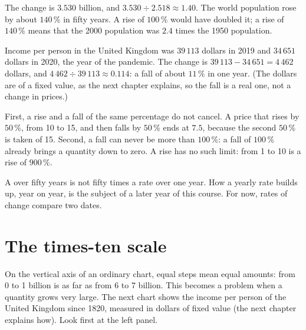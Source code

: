 \begin{example}\label{ex:g6:reading-economic-charts:pop-rise}
The change is $3.530$ billion, and $3.530 \div 2.518 \approx 1.40$. The world
population rose by about $140\,\%$ in fifty years. A rise of $100\,\%$ would
have doubled it; a rise of $140\,\%$ means that the 2000 population was
$2.4$ times the 1950 population.
\end{example}

\begin{example}\label{ex:g6:reading-economic-charts:uk-fall}
Income per person in the United Kingdom was $39\,113$ dollars in 2019 and
$34\,651$ dollars in 2020, the year of the pandemic. The change is
$39\,113 - 34\,651 = 4\,462$ dollars, and $4\,462 \div 39\,113 \approx 0.114$:
a fall of about $11\,\%$ in one year. (The dollars are of a fixed value, as the
next chapter explains, so the fall is a real one, not a change in prices.)
\end{example}

\begin{remark}\label{rem:g6:reading-economic-charts:traps}
First, a rise and a fall of the same percentage do not cancel. A price that
rises by $50\,\%$, from 10 to 15, and then falls by $50\,\%$ ends at
$7.5$, because the second $50\,\%$ is taken of 15. Second, a fall can never be
more than $100\,\%$: a fall of $100\,\%$ already brings a quantity down to
zero. A rise has no such limit: from 1 to 10 is a rise of $900\,\%$.
\end{remark}

A  over fifty years is not fifty times a rate over one year.
How a yearly rate builds up, year on year, is the subject of a later year of
this course. For now, rates of change compare two dates.

\section{The times-ten scale}

On the vertical axis of an ordinary chart, equal steps mean equal amounts:
from 0 to 1 billion is as far as from 6 to 7 billion. This becomes a problem
when a quantity grows very large. The next chart shows the income per person
of the United Kingdom since 1820, measured in dollars of fixed value (the next
chapter explains how). Look first at the left panel.

